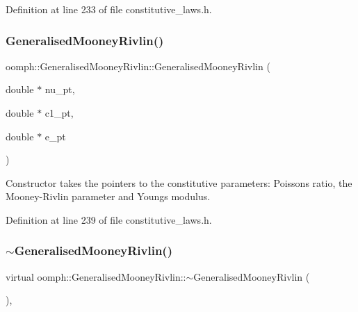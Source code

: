 Definition at line 233 of file constitutive\+\_\+laws.\+h.

\mbox{\label{classoomph_1_1GeneralisedMooneyRivlin_a4c709851b0ed6e9a975d69c1b2146429}} 
\subsubsection{\texorpdfstring{Generalised\+Mooney\+Rivlin()}{GeneralisedMooneyRivlin()}\hspace{0.1cm}{\footnotesize\ttfamily [2/2]}}
{\footnotesize\ttfamily oomph\+::\+Generalised\+Mooney\+Rivlin\+::\+Generalised\+Mooney\+Rivlin (\begin{DoxyParamCaption}\item[{double $\ast$}]{nu\+\_\+pt,  }\item[{double $\ast$}]{c1\+\_\+pt,  }\item[{double $\ast$}]{e\+\_\+pt }\end{DoxyParamCaption})\hspace{0.3cm}{\ttfamily [inline]}}



Constructor takes the pointers to the constitutive parameters\+: Poisson\textquotesingle{}s ratio, the Mooney-\/\+Rivlin parameter and Young\textquotesingle{}s modulus. 



Definition at line 239 of file constitutive\+\_\+laws.\+h.

\mbox{\label{classoomph_1_1GeneralisedMooneyRivlin_a855599e1cbdfbb9eb5aad3c5931e4f03}} 
\subsubsection{\texorpdfstring{$\sim$\+Generalised\+Mooney\+Rivlin()}{~GeneralisedMooneyRivlin()}}
{\footnotesize\ttfamily virtual oomph\+::\+Generalised\+Mooney\+Rivlin\+::$\sim$\+Generalised\+Mooney\+Rivlin (\begin{DoxyParamCaption}{ }\end{DoxyParamCaption})\hspace{0.3cm}{\ttfamily [inline]}, {\ttfamily [virtual]}}



